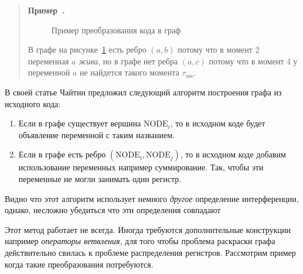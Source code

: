 \documentclass[12pt]{article}
\newcounter{example}[section]
\newenvironment{example}[1][]{\refstepcounter{example}\par\medskip\noindent\begin{quote}
\textbf{Пример~\theexample. #1}\rmfamily}{\end{quote}\medskip}
\begin{document}
\begin{example}
    \begin{figure}[H]
        \centering
    \caption{Пример преобразования кода в граф}
    \label{fig:ex1}
    \end{figure}

    В графе на рисунке~\ref{fig:ex1} есть ребро $(a, b)$ потому что в момент 2 переменная $a$ \textit{жива}, но в графе нет ребра $(a, c)$
    потому что в момент 4 у переменной $a$ не найдется такого момента $\tau_{\text{use}}$.
\end{example}


В своей статье Чайтин предложил следующий алгоритм построения графа из исходного кода:

\begin{enumerate}
    \item Если в графе существует вершина $\text{NODE}_i$, то в исходном коде будет объявление переменной с таким
    названием.
    \item Если в графе есть ребро $(\text{NODE}_i, \text{NODE}_j)$, то в исходном коде добавим использование переменных
    например суммирование. Так, чтобы эти переменные не могли занимать один регистр.
\end{enumerate}

Видно что этот алгоритм использует немного \textit{другое} определение интерференции, однако, несложно убедиться что эти определения
совпадают

Этот метод работает не всегда. Иногда требуются дополнительные конструкции например \textit{операторы ветвления},
для того чтобы проблема раскраски графа действительно свилась к проблеме распределения регистров. Рассмотрим пример когда такие
преобразования потребуются.
\end{document}
